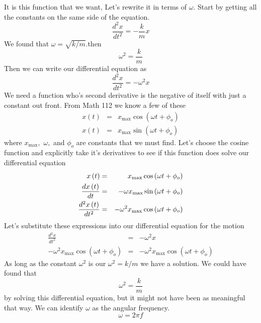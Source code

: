\documentclass{book}
\begin{document}
It is this function that we want, Let's rewrite it in terms of $\omega .$
Start by getting all the constants on the same side of the equation. 
\begin{equation*}
\frac{d^{2}x}{dt^{2}}=-\frac{k}{m}x
\end{equation*}%
We found that $\omega =\sqrt{k/m}.$then 
\begin{equation*}
\omega ^{2}=\frac{k}{m}
\end{equation*}
Then we can write our differential equation as%
\begin{equation}
\frac{d^{2}x}{dt^{2}}=-\omega ^{2}x
\end{equation}%
We need a function who's second derivative is the negative of itself with
just a constant out front. From Math 112 we know a few of these%
\begin{eqnarray*}
x\left( t\right) &=&x_{\max }\cos \left( \omega t+\phi _{o}\right) \\
x\left( t\right) &=&x_{\max }\sin \left( \omega t+\phi _{o}\right)
\end{eqnarray*}%
where $x_{\max },$ $\omega ,$ and $\phi _{o}$ are constants that we must
find. Let's choose the cosine function and explicitly take it's derivatives
to see if this function does solve our differential equation%
\begin{eqnarray}
x\left( t\right) &=&x_{\max }\cos \left( \omega t+\phi _{o}\right) \\
\frac{dx\left( t\right) }{dt} &=&-\omega x_{\max }\sin \left( \omega t+\phi
_{o}\right)  \notag \\
\frac{d^{2}x\left( t\right) }{dt^{2}} &=&-\omega ^{2}x_{\max }\cos \left(
\omega t+\phi _{o}\right)  \notag
\end{eqnarray}%
Let's substitute these expressions into our differential equation for the
motion%
\begin{eqnarray*}
\frac{d^{2}x}{dt^{2}} &=&-\omega ^{2}x \\
-\omega ^{2}x_{\max }\cos \left( \omega t+\phi _{o}\right) &=&-\omega
^{2}x_{\max }\cos \left( \omega t+\phi _{o}\right)
\end{eqnarray*}%
As long as the constant $\omega ^{2}$ is our $\omega ^{2}=k/m$ we have a
solution. We could have found that 
\begin{equation*}
\omega ^{2}=\frac{k}{m}
\end{equation*}%
by solving this differential equation, but it might not have been as
meaningful that way. We can identify $\omega $ as the angular frequency.%
\begin{equation*}
\omega =2\pi f
\end{equation*}
\end{document}
